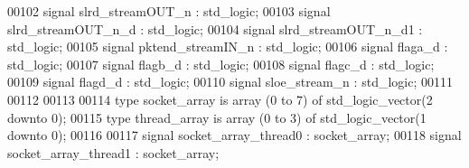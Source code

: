 \begin{DoxyCode}
00102 \textcolor{keywordflow}{signal} \textcolor{vhdlchar}{slrd_streamOUT_n}     \textcolor{vhdlchar}{:} \textcolor{comment}{std\_logic};
00103 \textcolor{keywordflow}{signal} \textcolor{vhdlchar}{slrd_streamOUT_n_d}   \textcolor{vhdlchar}{:} \textcolor{comment}{std\_logic};
00104 \textcolor{keywordflow}{signal} \textcolor{vhdlchar}{slrd_streamOUT_n_d1}  \textcolor{vhdlchar}{:} \textcolor{comment}{std\_logic};
00105 \textcolor{keywordflow}{signal} \textcolor{vhdlchar}{pktend_streamIN_n}    \textcolor{vhdlchar}{:} \textcolor{comment}{std\_logic};
00106 \textcolor{keywordflow}{signal} \textcolor{vhdlchar}{flaga_d}             \textcolor{vhdlchar}{:} \textcolor{comment}{std\_logic};
00107 \textcolor{keywordflow}{signal} \textcolor{vhdlchar}{flagb_d}             \textcolor{vhdlchar}{:} \textcolor{comment}{std\_logic};
00108 \textcolor{keywordflow}{signal} \textcolor{vhdlchar}{flagc_d}             \textcolor{vhdlchar}{:} \textcolor{comment}{std\_logic};
00109 \textcolor{keywordflow}{signal} \textcolor{vhdlchar}{flagd_d}             \textcolor{vhdlchar}{:} \textcolor{comment}{std\_logic};
00110 \textcolor{keywordflow}{signal} \textcolor{vhdlchar}{sloe_stream_n}            \textcolor{vhdlchar}{:} \textcolor{comment}{std\_logic};
00111 
00112 
00113 
00114 \textcolor{keywordflow}{type} \textcolor{vhdlchar}{socket_array} \textcolor{keywordflow}{is} \textcolor{keywordflow}{array} \textcolor{vhdlchar}{(}\textcolor{vhdllogic}{}\textcolor{vhdllogic}{0} \textcolor{keywordflow}{to} \textcolor{vhdllogic}{}\textcolor{vhdllogic}{7}\textcolor{vhdlchar}{)} \textcolor{keywordflow}{of} \textcolor{comment}{std\_logic\_vector}\textcolor{vhdlchar}{(}\textcolor{vhdllogic}{}\textcolor{vhdllogic}{2} \textcolor{keywordflow}{downto} \textcolor{vhdllogic}{}\textcolor{vhdllogic}{0}\textcolor{vhdlchar}{)};
00115 \textcolor{keywordflow}{type} \textcolor{vhdlchar}{thread_array} \textcolor{keywordflow}{is} \textcolor{keywordflow}{array} \textcolor{vhdlchar}{(}\textcolor{vhdllogic}{}\textcolor{vhdllogic}{0} \textcolor{keywordflow}{to} \textcolor{vhdllogic}{}\textcolor{vhdllogic}{3}\textcolor{vhdlchar}{)} \textcolor{keywordflow}{of} \textcolor{comment}{std\_logic\_vector}\textcolor{vhdlchar}{(}\textcolor{vhdllogic}{}\textcolor{vhdllogic}{1} \textcolor{keywordflow}{downto} \textcolor{vhdllogic}{}\textcolor{vhdllogic}{0}\textcolor{vhdlchar}{)};
00116 
00117 \textcolor{keywordflow}{signal} \textcolor{vhdlchar}{socket_array_thread0} \textcolor{vhdlchar}{:} \textcolor{vhdlchar}{socket_array};
00118 \textcolor{keywordflow}{signal} \textcolor{vhdlchar}{socket_array_thread1} \textcolor{vhdlchar}{:} \textcolor{vhdlchar}{socket_array};

\end{DoxyCode}
